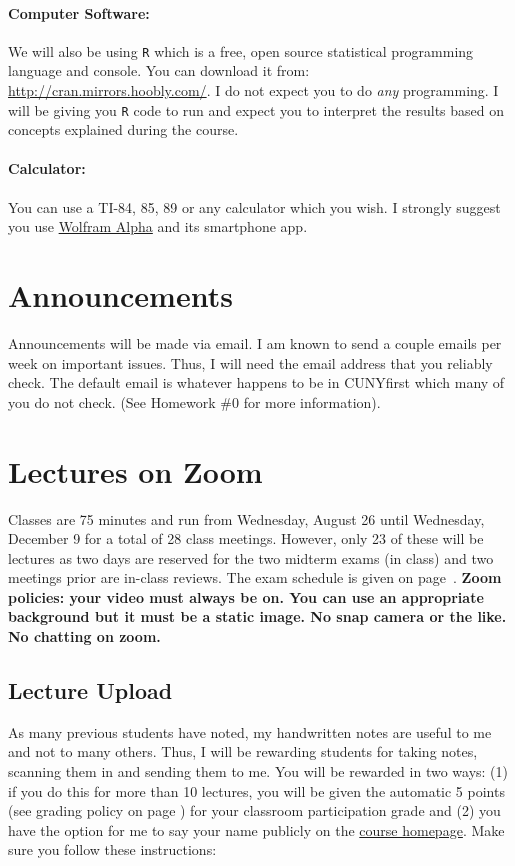 \documentclass[12pt]{article}
\newcommand{\coursewebpage}{\href{https://github.com/kapelner/QC_Math_369_Fall_2020}{course homepage}}
\begin{document}
\paragraph{Computer Software:} We will also be using \texttt{R} which is a free, open source statistical programming language and console. You can download it from: \url{http://cran.mirrors.hoobly.com/}. I do not expect you to do \textit{any} programming. I will be giving you \texttt{R} code to run and expect you to interpret the results based on concepts explained during the course.

\paragraph{Calculator:} You can use a TI-84, 85, 89 or any calculator which you wish. I strongly suggest you use \href{http://www.wolframalpha.com/}{Wolfram Alpha} and its smartphone app.

\section*{Announcements}

Announcements will be made via email. I am known to send a couple emails per week on important issues. Thus, I will need the email address that you reliably check. The default email is whatever happens to be in CUNYfirst which many of you do not check. (See Homework \#0 for more information).

\section*{Lectures on Zoom}

Classes are 75 minutes and run from Wednesday, August 26 until Wednesday, December 9 for a total of 28 class meetings. However, only 23 of these will be lectures as two days are reserved for the two midterm exams (in class) and two meetings prior are in-class reviews. The exam schedule is given on page~\pageref{subsec:exam_schedule}. \textbf{Zoom policies: your video must always be on. You can use an appropriate background but it must be a static image. No snap camera or the like. No chatting on zoom.}

\subsection*{Lecture Upload}

As many previous students have noted, my handwritten notes are useful to me and not to many others. Thus, I will be rewarding students for taking notes, scanning them in and sending them to me. You will be rewarded in two ways: (1) if you do this for more than 10 lectures, you will be given the automatic 5 points (see grading policy on page \pageref{sec:grading}) for your classroom participation grade and (2) you have the option for me to say your name publicly on the \coursewebpage. Make sure you follow these instructions:
\end{document}
